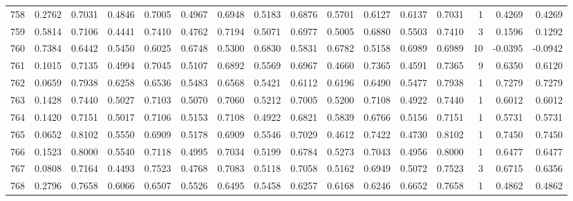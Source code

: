 \begin{tabular}{lrrrrrrrrrrrrrrr}
758 &      0.2762 &  0.7031 &  0.4846 &  0.7005 &  0.4967 &  0.6948 &  0.5183 &  0.6876 &  0.5701 &  0.6127 &   0.6137 &     0.7031 &      1 &                    0.4269 &                     0.4269 \\
759 &      0.5814 &  0.7106 &  0.4441 &  0.7410 &  0.4762 &  0.7194 &  0.5071 &  0.6977 &  0.5005 &  0.6880 &   0.5503 &     0.7410 &      3 &                    0.1596 &                     0.1292 \\
760 &      0.7384 &  0.6442 &  0.5450 &  0.6025 &  0.6748 &  0.5300 &  0.6830 &  0.5831 &  0.6782 &  0.5158 &   0.6989 &     0.6989 &     10 &                   -0.0395 &                    -0.0942 \\
761 &      0.1015 &  0.7135 &  0.4994 &  0.7045 &  0.5107 &  0.6892 &  0.5569 &  0.6967 &  0.4660 &  0.7365 &   0.4591 &     0.7365 &      9 &                    0.6350 &                     0.6120 \\
762 &      0.0659 &  0.7938 &  0.6258 &  0.6536 &  0.5483 &  0.6568 &  0.5421 &  0.6112 &  0.6196 &  0.6490 &   0.5477 &     0.7938 &      1 &                    0.7279 &                     0.7279 \\
763 &      0.1428 &  0.7440 &  0.5027 &  0.7103 &  0.5070 &  0.7060 &  0.5212 &  0.7005 &  0.5200 &  0.7108 &   0.4922 &     0.7440 &      1 &                    0.6012 &                     0.6012 \\
764 &      0.1420 &  0.7151 &  0.5017 &  0.7106 &  0.5153 &  0.7108 &  0.4922 &  0.6821 &  0.5839 &  0.6766 &   0.5156 &     0.7151 &      1 &                    0.5731 &                     0.5731 \\
765 &      0.0652 &  0.8102 &  0.5550 &  0.6909 &  0.5178 &  0.6909 &  0.5546 &  0.7029 &  0.4612 &  0.7422 &   0.4730 &     0.8102 &      1 &                    0.7450 &                     0.7450 \\
766 &      0.1523 &  0.8000 &  0.5540 &  0.7118 &  0.4995 &  0.7034 &  0.5199 &  0.6784 &  0.5273 &  0.7043 &   0.4956 &     0.8000 &      1 &                    0.6477 &                     0.6477 \\
767 &      0.0808 &  0.7164 &  0.4493 &  0.7523 &  0.4768 &  0.7083 &  0.5118 &  0.7058 &  0.5162 &  0.6949 &   0.5072 &     0.7523 &      3 &                    0.6715 &                     0.6356 \\
768 &      0.2796 &  0.7658 &  0.6066 &  0.6507 &  0.5526 &  0.6495 &  0.5458 &  0.6257 &  0.6168 &  0.6246 &   0.6652 &     0.7658 &      1 &                    0.4862 &                     0.4862 \\

\end{tabular}
